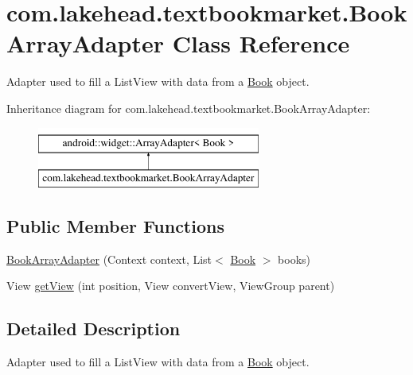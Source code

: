\hypertarget{classcom_1_1lakehead_1_1textbookmarket_1_1_book_array_adapter}{\section{com.\-lakehead.\-textbookmarket.\-Book\-Array\-Adapter Class Reference}
\label{classcom_1_1lakehead_1_1textbookmarket_1_1_book_array_adapter}
}


Adapter used to fill a List\-View with data from a \hyperlink{classcom_1_1lakehead_1_1textbookmarket_1_1_book}{Book} object.  


Inheritance diagram for com.\-lakehead.\-textbookmarket.\-Book\-Array\-Adapter\-:\begin{figure}[H]
\begin{center}
\leavevmode
\includegraphics[height=2.000000cm]{classcom_1_1lakehead_1_1textbookmarket_1_1_book_array_adapter}
\end{center}
\end{figure}
\subsection*{Public Member Functions}
\begin{DoxyCompactItemize}
\item 
\hyperlink{classcom_1_1lakehead_1_1textbookmarket_1_1_book_array_adapter_ae07568cb769d46c1d217c333e5057ad5}{Book\-Array\-Adapter} (Context context, List$<$ \hyperlink{classcom_1_1lakehead_1_1textbookmarket_1_1_book}{Book} $>$ books)
\item 
View \hyperlink{classcom_1_1lakehead_1_1textbookmarket_1_1_book_array_adapter_a849ebf81ddcee52a0eabcf3162041316}{get\-View} (int position, View convert\-View, View\-Group parent)
\end{DoxyCompactItemize}


\subsection{Detailed Description}
Adapter used to fill a List\-View with data from a \hyperlink{classcom_1_1lakehead_1_1textbookmarket_1_1_book}{Book} object. 

